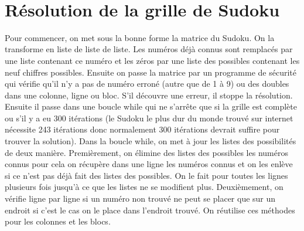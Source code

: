 \documentclass[12pt]{article}
\begin{document}
\vspace*{1cm}
\noindent
{}\\

\section{Résolution de la grille de Sudoku}

Pour commencer, on met sous la bonne forme la matrice du Sudoku. On la transforme en liste de liste de liste. Les numéros déjà connus sont remplacés par une liste contenant ce numéro et les zéros par une liste des possibles contenant les neuf chiffres possibles. Ensuite on passe la matrice par un programme de sécurité qui vérifie qu'il n'y a pas de numéro erroné (autre que de 1 à 9) ou des doubles dans une colonne, ligne ou bloc. S'il découvre une erreur, il stoppe la résolution.\\

\noindent
Ensuite il passe dans une boucle while qui ne s'arrête que si la grille est complète ou s'il y a eu 300  itérations (le Sudoku le plus dur du monde trouvé sur internet nécessite 243 itérations donc normalement 300 itérations devrait suffire pour trouver la solution). Dans la boucle while, on met à jour les listes des possibilités de deux manière. Premièrement, on élimine des listes des possibles les numéros connus pour cela on récupère dans une ligne les numéros connus et on les enlève si ce n'est pas déjà fait des listes des possibles. On le fait pour toutes les lignes plusieurs fois jusqu'à ce que les listes ne se modifient plus. Deuxièmement, on vérifie ligne par ligne si un numéro non trouvé ne peut se placer que sur un endroit si c'est le cas on le place dans l'endroit trouvé. On réutilise ces méthodes pour les colonnes et les blocs.\\
\end{document}
